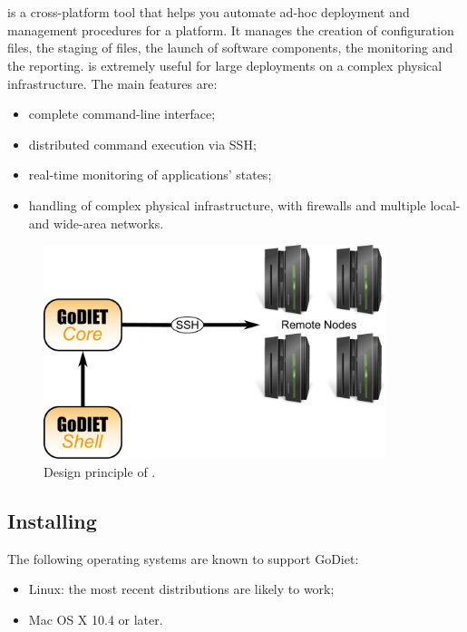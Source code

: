 \section{\godiet}
\label{sec:deployGoDIET}

\godiet is a cross-platform tool that helps you automate ad-hoc deployment and
management procedures for a \diet platform. It manages
the creation of configuration files, the staging of files, the launch of software components, the monitoring and the reporting. \godiet is extremely useful for large deployments on a complex physical infrastructure. The main features are:
\begin{itemize}
  \item complete command-line interface;
  \item distributed command execution via SSH;
  \item real-time monitoring of applications' states;
  \item handling of complex physical infrastructure, with firewalls and multiple local- and wide-area networks.
\end{itemize}
\begin{figure}[h]
  \centering
  \includegraphics[width=10cm]{fig/schemaPhilippe}
  \caption{Design principle of \godiet.\label{fig:GODIETDesign}}
\end{figure}


\subsection{Installing \godiet}

The following operating systems are known to support GoDiet:
\begin{itemize}
    \item Linux: the most recent distributions are likely to work;
    \item Mac OS X 10.4 or later.
\end{itemize}

